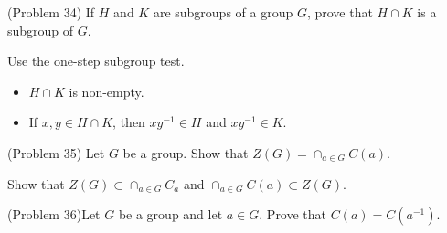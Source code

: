 \documentclass[12pt]{exam}
\begin{document}
\begin{questions}
\question[20] (Problem 34) If \(H\) and \(K\) are subgroups of a group \(G\), prove that \(H \cap K\) is a subgroup of \(G\).

\begin{solution}
    Use the one-step subgroup test. 
    \begin{itemize}
        \item \(H \cap K\) is non-empty.
        \item If \(x,y \in H \cap K\), then \(xy^{-1} \in H\) and \(xy^{-1} \in K\).
    \end{itemize}
\end{solution}
\droptotalpoints

\question[20] (Problem 35) Let \(G\) be a group. Show that \(Z(G)=\cap_{a \in G} C(a)\).

\begin{solution}
    Show that \(Z(G) \subset \cap_{a\in G}C_a\) and \(\cap_{a\in G} C(a) \subset Z(G)\).
\end{solution}
\droptotalpoints

\question[] (Problem 36)Let \(G\) be a group and let \(a \in G\). Prove that \(C(a) = C(a^{-1}).\)








\end{questions}
\end{document}
